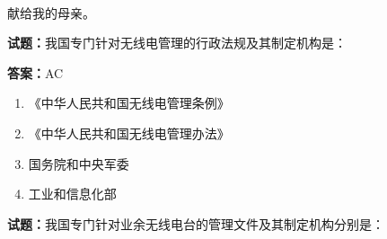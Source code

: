 \documentclass{ctexbook}
\newcommand{\reponame}{mike2718/ham}    %
\newcommand{\commiturl}{\url{https://github.com/\reponame/commit/\commithash}}
\begin{document}

\title{}
\author{\large \texttt{BG7XTQ}编著}
\date{\large{日期：\texttt{\today}}
  \vspace{15em}
  \\使用 
  \\编译自提交 \texttt{\commiturl}
}

\maketitle %

\thispagestyle{empty}
\vfil
\ \\
\vspace{15em}
\begin{center}
  {\Large 献给我的母亲。}
\end{center}

\newpage
\tableofcontents









\vspace{1em}

\textbf{试题：}我国专门针对无线电管理的行政法规及其制定机构是： 

\textbf{答案：}AC 

\begin{enumerate}[leftmargin=3em]
  \item 《中华人民共和国无线电管理条例》 

  \item 《中华人民共和国无线电管理办法》 

  \item 国务院和中央军委 

  \item 工业和信息化部 

\end{enumerate}





\vspace{1em}

\textbf{试题：}我国专门针对业余无线电台的管理文件及其制定机构分别是： 
\end{document}
